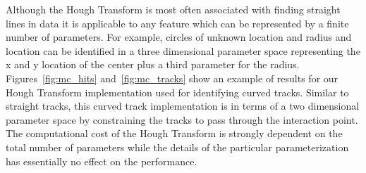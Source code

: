 \documentclass{JINST}
\begin{document}
Although the Hough Transform is most often associated with finding straight lines in data it is applicable to any feature which can be represented 
by a finite number of parameters.  For example, circles of unknown location and radius and location can be identified in a three dimensional parameter 
space representing the x and y location of the center plus a third parameter for the radius.  Figures~\ref{fig:mc_hits} and~\ref{fig:mc_tracks} show 
an example of results for our Hough Transform implementation used for identifying curved tracks.  Similar to straight tracks, this curved track 
implementation is in terms of a two dimensional parameter space by constraining the tracks to pass through the interaction point.  
The computational cost of the Hough Transform is strongly dependent on the total number of parameters while the details of the particular parameterization
 has essentially no effect on the performance.
\end{document}
